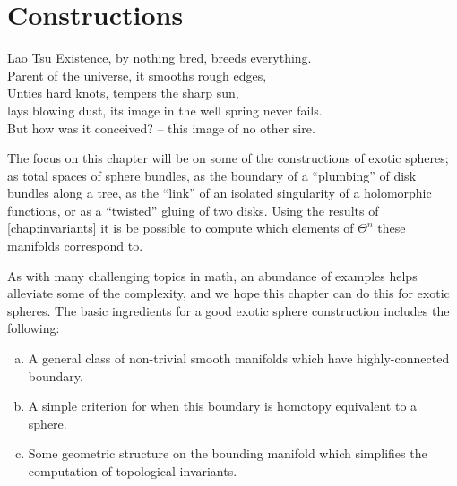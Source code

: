 \chapter{Constructions}\label{chap:constructions}

\begin{epigraph}{25em}{Lao Tsu}
Existence, by nothing bred, breeds everything.\\
Parent of the universe, it smooths rough edges,\\
Unties hard knots, tempers the sharp sun, \\
lays blowing dust, its image in the well spring never fails. \\
But how was it conceived? -- this image of no other sire.
\end{epigraph}

The focus on this chapter will be on some of the constructions of exotic spheres; as total spaces of sphere bundles, as the boundary of a ``plumbing'' of disk bundles along a tree, as the ``link'' of an isolated singularity of a holomorphic functions, or as a ``twisted'' gluing of two disks. Using the results of \cref{chap:invariants} it is be possible to compute which elements of $\Theta^n$ these manifolds correspond to.

As with many challenging topics in math, an abundance of examples helps alleviate some of the complexity, and we hope this chapter can do this for exotic spheres.
The basic ingredients for a good exotic sphere construction includes the following:
\begin{enumerate}[(a)]
	\item A general class of non-trivial smooth manifolds which have highly-connected boundary.
	\item A simple criterion for when this boundary is homotopy equivalent to a sphere.
	\item Some geometric structure on the bounding manifold which simplifies the computation of topological invariants.
\end{enumerate}





